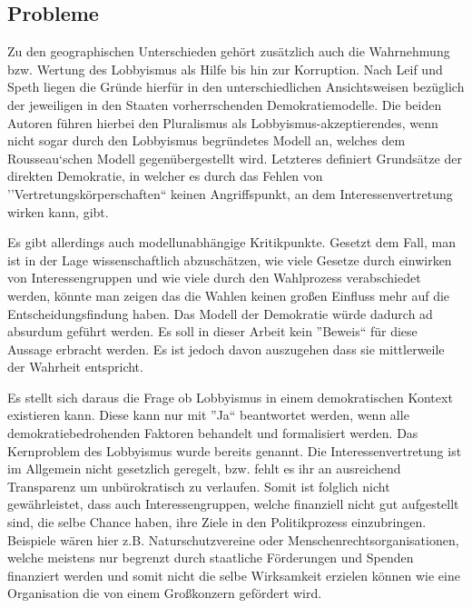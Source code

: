 \subsection{Probleme}
Zu den geographischen Unterschieden gehört zusätzlich auch die Wahrnehmung bzw. 
Wertung des 
Lobbyismus als Hilfe bis hin zur Korruption. Nach Leif und Speth liegen die 
Gründe hierfür in den unterschiedlichen Ansichtsweisen bezüglich der jeweiligen 
in den Staaten vorherrschenden Demokratiemodelle. Die beiden Autoren führen 
hierbei den Pluralismus als Lobbyismus-akzeptierendes, wenn nicht sogar durch 
den Lobbyismus begründetes Modell an, welches dem Rousseau`schen Modell 
gegenübergestellt wird. Letzteres definiert Grundsätze der direkten Demokratie, 
in welcher es durch das Fehlen von 
''Vertretungskörperschaften``\cite{WikiIdentitaetstheorie} keinen 
Angriffspunkt, an dem Interessenvertretung wirken kann, gibt.

Es gibt allerdings auch modellunabhängige Kritikpunkte. Gesetzt dem Fall, man 
ist in der Lage wissenschaftlich abzuschätzen, wie viele Gesetze durch einwirken
von Interessengruppen und wie viele durch den Wahlprozess verabschiedet werden, 
könnte man zeigen das die Wahlen keinen großen Einfluss mehr auf die 
Entscheidungsfindung haben. Das Modell der Demokratie würde dadurch ad absurdum 
geführt werden. Es soll in dieser Arbeit kein ''Beweis`` für diese Aussage 
erbracht werden. Es ist jedoch davon auszugehen dass sie mittlerweile der 
Wahrheit entspricht.

Es stellt sich daraus die Frage ob Lobbyismus in einem demokratischen Kontext 
existieren kann. Diese kann nur mit ''Ja`` beantwortet werden, wenn alle 
demokratiebedrohenden Faktoren behandelt und formalisiert werden. Das 
Kernproblem des Lobbyismus wurde bereits genannt. Die Interessenvertretung ist 
im Allgemein nicht gesetzlich geregelt, bzw. fehlt es ihr an ausreichend 
Transparenz um unbürokratisch zu verlaufen. Somit ist folglich nicht 
gewährleistet, 
dass auch Interessengruppen, welche finanziell nicht gut aufgestellt sind, die 
selbe Chance haben, ihre Ziele in den Politikprozess einzubringen. Beispiele 
wären hier z.B. Naturschutzvereine oder Menschenrechtsorganisationen, welche 
meistens nur begrenzt durch staatliche Förderungen und Spenden finanziert 
werden und somit nicht die selbe Wirksamkeit erzielen können wie eine 
Organisation die von einem Großkonzern gefördert wird.

